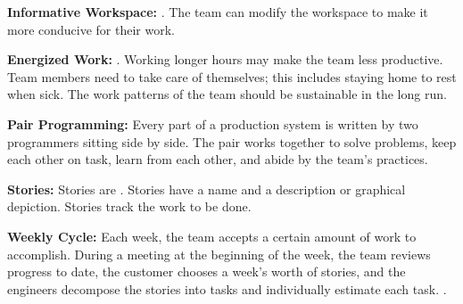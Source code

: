 

\textbf{Informative Workspace:}  \cite{BeckExtremeProgramming2004}. The team can modify the workspace to make it more conducive for their work. 


\textbf{Energized Work:}  \cite{BeckExtremeProgramming2004}. Working longer hours may make the team less productive. Team members need to take care of themselves; this includes staying home to rest when sick. The work patterns of the team should be sustainable in the long run.

\textbf{Pair Programming:} Every part of a production system is written by two programmers sitting side by side. The pair works together to solve problems, keep each other on task, learn from each other, and abide by the team's practices.


\textbf{Stories:} Stories are   \cite{BeckExtremeProgramming2004}. Stories have a name and a description or graphical depiction. Stories track the work to be done.


\textbf{Weekly Cycle:} Each week, the team accepts a certain amount of work to accomplish. During a meeting at the beginning of the week, the team reviews progress to date, the customer chooses a week's worth of stories, and the engineers decompose the stories into tasks and individually estimate each task.   \cite{BeckExtremeProgramming2004}. 

